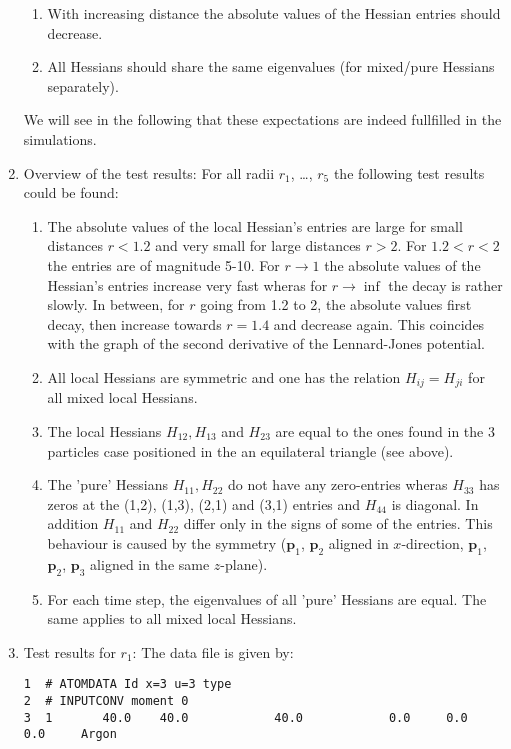 \documentclass[a4paper]{article}
\newcommand{\boldp}{\boldsymbol{p}}
\begin{document}
\begin{enumerate}
\begin{enumerate}
\item With increasing distance the absolute values of the Hessian entries should decrease.
\item All Hessians should share the same eigenvalues (for mixed/pure Hessians separately).
\end{enumerate}
We will see in the following that these expectations are indeed fullfilled in the simulations.
\item Overview of the test results:
\label{sec-1-6-1-3}
For all radii \(r_1\), \ldots{}, \(r_5\) the following test results could be found:
\begin{enumerate}
\item The absolute values of the local Hessian's entries are large for small distances \(r < 1.2\) and very small for large distances \(r > 2\). For \(1.2 < r < 2\) the entries are of magnitude 5-10.
For \(r \to 1\) the absolute values of the Hessian's entries increase very fast wheras for \(r \to \inf\) the decay is rather slowly. In between, for \(r\) going from 1.2 to 2, the absolute values first decay, then increase towards \(r = 1.4\) and decrease again.
This coincides with the graph of the second derivative of the Lennard-Jones potential.
\item All local Hessians are symmetric and one has the relation \(H_{ij} = H_{ji}\) for all mixed local Hessians.
\item The local Hessians \(H_{12}, H_{13}\) and \(H_{23}\) are equal to the ones found in the 3 particles case positioned in the an equilateral triangle (see above).
\item The 'pure' Hessians \(H_{11}, H_{22}\) do not have any zero-entries wheras \(H_{33}\) has zeros at the (1,2), (1,3), (2,1) and (3,1) entries and \(H_{44}\) is diagonal. In addition \(H_{11}\) and \(H_{22}\) differ only in the signs of some of the entries.
This behaviour is caused by the symmetry (\(\boldp_1\), \(\boldp_2\) aligned in \(x\)-direction, \(\boldp_1\), \(\boldp_2\), \(\boldp_3\) aligned in the same \(z\)-plane).
\item For each time step, the eigenvalues of all 'pure' Hessians are equal. The same applies to all mixed local Hessians.
\end{enumerate}
\item Test results for \(r_1\):
\label{sec-1-6-1-4}
The data file is given by:
\begin{verbatim}
1  # ATOMDATA Id x=3 u=3 type
2  # INPUTCONV moment 0
3  1       40.0    40.0            40.0            0.0     0.0     0.0     Argon

\end{verbatim}
\end{enumerate}
\end{document}
